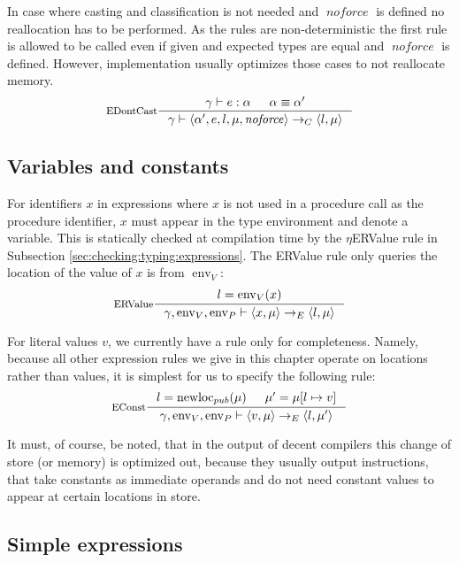 \documentclass[a4paper, 10pt, draft]{report}
\DeclareMathOperator*{\env}{env}
\DeclareMathOperator*{\newloc}{newloc}
\DeclareMathOperator*{\noforce}{\mathit{noforce}}
\begin{document}
In case where casting and classification is not needed and $\noforce$ is
defined no reallocation has to be performed. As the rules are non-deterministic
the first rule is allowed to be called even if given and expected types are
equal and $\noforce$ is defined. However, implementation usually optimizes
those cases to not reallocate memory.
\[
\inference[EDontCast]
{
  \gamma |- e : \alpha & \alpha \equiv \alpha' \\
}{
  \gamma |- \left<\alpha', e, l, \mu, \noforce \right> \to_C \left<l, \mu \right>
}
\]


\subsection{Variables and constants}\label{sec:semantics:expr:constvar}

For identifiers $x$ in expressions where $x$ is not used in a procedure call as
the procedure identifier, $x$ must appear in the type environment and denote a
variable. This is statically checked at compilation time by the $\eta$ERValue
rule in Subsection \ref{sec:checking:typing:expressions}. The ERValue rule only
queries the location of the value of $x$ is from $\operatorname{env}_V$:
\[ \inference[ERValue]{
  l = \env_V(x)
}{
  \gamma, \env_V, \env_P |- \left< x , \mu \right> \to_E \left<l, \mu \right>
} \]

For literal values $v$, we currently have a rule only for completeness. Namely,
because all other expression rules we give in this chapter operate on locations
rather than values, it is simplest for us to specify the following rule:
\[ \inference[EConst]{
  l = \newloc_{pub}(\mu) &
  \mu' = \mu[l \mapsto v]
}{
  \gamma, \env_V, \env_P |- \left<v, \mu\right> \to_E \left<l, \mu'\right>
} \]

It must, of course, be noted, that in the output of decent compilers this
change of store (or memory) is optimized out, because they usually output
instructions, that take constants as immediate operands and do not need
constant values to appear at certain locations in store.

\subsection{Simple expressions}\label{sec:semantics:expr:arith}
\end{document}
